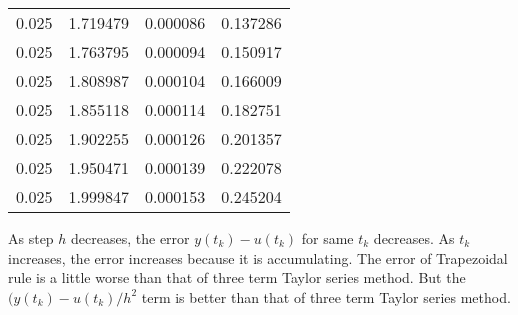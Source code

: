 \documentclass[10pt]{report}
\begin{document}
\begin{enumerate}
\begin{table}[H]
\begin{tabular}{*{3}{N} M{6em}}
			0.025 & 1.719479 & 0.000086 & 0.137286\\
			0.025 & 1.763795 & 0.000094 & 0.150917\\
			0.025 & 1.808987 & 0.000104 & 0.166009\\
			0.025 & 1.855118 & 0.000114 & 0.182751\\
			0.025 & 1.902255 & 0.000126 & 0.201357\\
			0.025 & 1.950471 & 0.000139 & 0.222078\\
			0.025 & 1.999847 & 0.000153 & 0.245204\\
			\bottomrule
		\end{tabular}
		\vspace{-2ex}
	\end{table}
	As step $h$ decreases, the error $y(t_k) - u(t_k)$ for same $t_k$ decreases. As $t_k$ increases, the error increases because it is accumulating. The error of Trapezoidal rule is a little worse than that of three term Taylor series method. But the $(y(t_k)-u(t_k)/h^2$ term is better than that of three term Taylor series method.
\end{enumerate}
\end{document}
